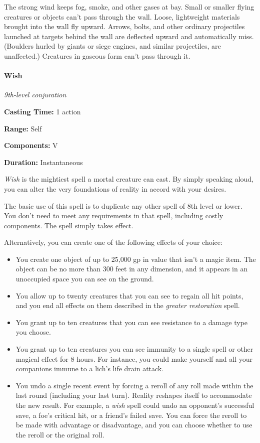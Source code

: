\documentclass[
]{article}
\providecommand{\tightlist}{%
  \setlength{\itemsep}{0pt}\setlength{\parskip}{0pt}}
\begin{document}
The strong wind keeps fog, smoke, and other gases at bay. Small or
smaller flying creatures or objects can't pass through the wall. Loose,
lightweight materials brought into the wall fly upward. Arrows, bolts,
and other ordinary projectiles launched at targets behind the wall are
deflected upward and automatically miss. (Boulders hurled by giants or
siege engines, and similar projectiles, are unaffected.) Creatures in
gaseous form can't pass through it.

\hypertarget{wish}{%
\paragraph{Wish}\label{wish}}

\emph{9th-level conjuration}

\textbf{Casting Time:} 1 action

\textbf{Range:} Self

\textbf{Components:} V

\textbf{Duration:} Instantaneous

\emph{Wish} is the mightiest spell a mortal creature can cast. By simply
speaking aloud, you can alter the very foundations of reality in accord
with your desires.

The basic use of this spell is to duplicate any other spell of 8th level
or lower. You don't need to meet any requirements in that spell,
including costly components. The spell simply takes effect.

Alternatively, you can create one of the following effects of your
choice:

\begin{itemize}
\tightlist
\item
  You create one object of up to 25,000 gp in value that isn't a magic
  item. The object can be no more than 300 feet in any dimension, and it
  appears in an unoccupied space you can see on the ground.
\item
  You allow up to twenty creatures that you can see to regain all hit
  points, and you end all effects on them described in the \emph{greater
  restoration} spell.
\item
  You grant up to ten creatures that you can see resistance to a damage
  type you choose.
\item
  You grant up to ten creatures you can see immunity to a single spell
  or other magical effect for 8 hours. For instance, you could make
  yourself and all your companions immune to a lich's life drain attack.
\item
  You undo a single recent event by forcing a reroll of any roll made
  within the last round (including your last turn). Reality reshapes
  itself to accommodate the new result. For example, a \emph{wish} spell
  could undo an opponent's successful save, a foe's critical hit, or a
  friend's failed save. You can force the reroll to be made with
  advantage or disadvantage, and you can choose whether to use the
  reroll or the original roll.
\end{itemize}
\end{document}
